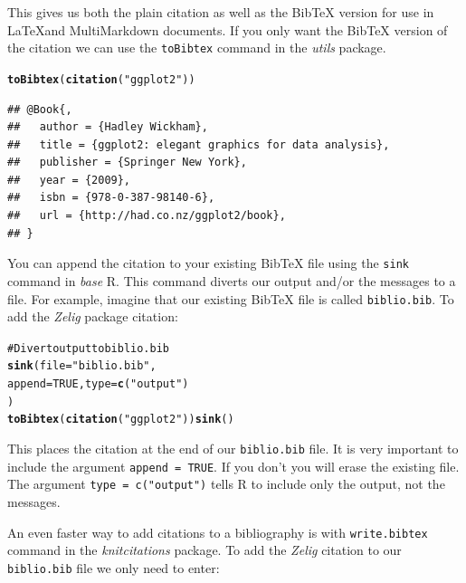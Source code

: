 \documentclass[ChapterTOCs,krantz1]{krantz}\usepackage{graphicx, color}
\makeatletter
\newcommand{\hlfunctioncall}[1]{\textcolor[rgb]{0.501960784313725,0,0.329411764705882}{\textbf{#1}}}%
\newcommand{\hlstring}[1]{\textcolor[rgb]{0.6,0.6,1}{#1}}%
\newcommand{\hlcomment}[1]{\textcolor[rgb]{0.180392156862745,0.6,0.341176470588235}{#1}}%
\newenvironment{kframe}{%
 \def\at@end@of@kframe{}%
 \ifinner\ifhmode%
  \def\at@end@of@kframe{\end{minipage}}%
  \begin{minipage}{\columnwidth}%
 \fi\fi%
 \def\FrameCommand##1{\hskip\@totalleftmargin \hskip-\fboxsep
 \colorbox{shadecolor}{##1}\hskip-\fboxsep
     \hskip-\linewidth \hskip-\@totalleftmargin \hskip\columnwidth}%
 \MakeFramed {\advance\hsize-\width
   \@totalleftmargin\z@ \linewidth\hsize
   \@setminipage}}%
 {\par\unskip\endMakeFramed%
 \at@end@of@kframe}
\newenvironment{knitrout}{}{} %
\makeatother
\begin{document}
\noindent This gives us both the plain citation as well as the BibTeX version for use in \LaTeX and MultiMarkdown documents. If you only want the BibTeX version of the citation we can use the \texttt{toBibtex} command in the \emph{utils} package.

\begin{knitrout}
\color{fgcolor}\begin{kframe}
\begin{alltt}
\hlfunctioncall{toBibtex}(\hlfunctioncall{citation}(\hlstring{"ggplot2"}))
\end{alltt}
\begin{verbatim}
## @Book{,
##   author = {Hadley Wickham},
##   title = {ggplot2: elegant graphics for data analysis},
##   publisher = {Springer New York},
##   year = {2009},
##   isbn = {978-0-387-98140-6},
##   url = {http://had.co.nz/ggplot2/book},
## }
\end{verbatim}
\end{kframe}
\end{knitrout}


\noindent You can append the citation to your existing BibTeX file using the \texttt{sink} command in \emph{base} R. This command diverts our output and/or the messages to a file. For example, imagine that our existing BibTeX file is called \texttt{biblio.bib}. To add the \emph{Zelig} package citation:

\begin{knitrout}
\color{fgcolor}\begin{kframe}
\begin{alltt}
\hlcomment{# Divert output to biblio.bib}
\hlfunctioncall{sink}(file = \hlstring{"biblio.bib"}, 
     append = TRUE, type = \hlfunctioncall{c}(\hlstring{"output"})
     )      
\hlfunctioncall{toBibtex}(\hlfunctioncall{citation}(\hlstring{"ggplot2"})) \hlfunctioncall{sink}()
\end{alltt}
\end{kframe}
\end{knitrout}


\noindent This places the citation at the end of our \texttt{biblio.bib} file. It is very important to include the argument \texttt{append = TRUE}. If you don't you will erase the existing file. The argument \texttt{type = c("output")} tells R to include only the output, not the messages.

An even faster way to add citations to a bibliography is with \texttt{write.bibtex} command in the \emph{knitcitations} package. To add the \emph{Zelig} citation to our \texttt{biblio.bib} file we only need to enter:
\end{document}
